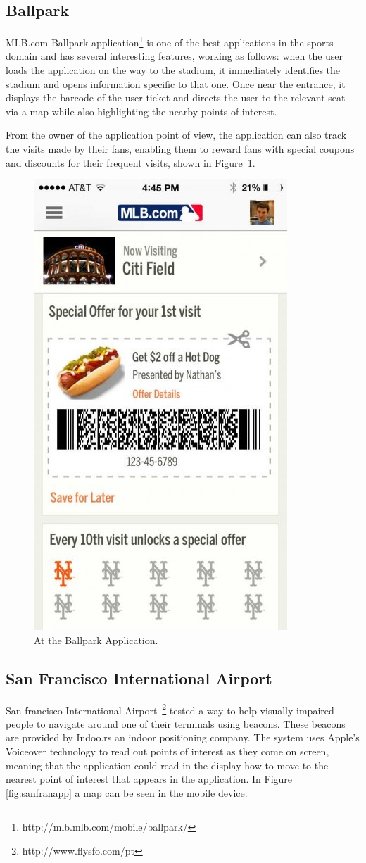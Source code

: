 \subsection{Ballpark}
\label{subsection:ballpark}
MLB.com Ballpark application\footnote{http://mlb.mlb.com/mobile/ballpark/}
is one of the best applications in the sports domain and has several interesting features, working as follows: when the user loads the application on the way to the stadium, it immediately identifies the stadium and opens information specific to that one. Once near the entrance, it displays the barcode of the user ticket and directs the user to the relevant seat via a map while also highlighting the nearby points of interest.

From the owner of the application point of view, the application can also track the visits made by their fans, enabling them to reward fans with special coupons and discounts for their frequent visits, shown in Figure~\ref{fig:ballparkapp}. 


\begin{figure}[!htb]
  \centering
 \includegraphics[width=0.35\linewidth]{Figures/ballpark3_data.png}
  \caption[At the Ballpark Application]{At the Ballpark Application.}
 \label{fig:ballparkapp}
\end{figure}


\subsection{San Francisco International Airport}
\label{subsection:sanfrancisco}
San francisco International Airport~\footnote{http://www.flysfo.com/pt} tested a way to help visually-impaired people to navigate around one of their terminals using beacons. These beacons are provided by Indoo.rs an indoor positioning company.
The system uses Apple's Voiceover technology to read out points of interest as they come on screen, meaning that the application could read in the display how to move to the nearest point of interest that appears in the application. In Figure \ref{fig:sanfranapp} a map can be seen in the mobile device.

